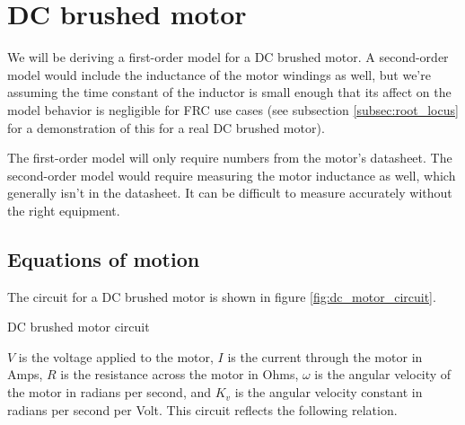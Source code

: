\section{DC brushed motor}
\label{sec:dc_brushed_motor}

We will be deriving a first-order \gls{model} for a DC brushed motor. A
second-order \gls{model} would include the inductance of the motor windings as
well, but we're assuming the time constant of the inductor is small enough that
its affect on the \gls{model} behavior is negligible for FRC use cases (see
subsection \ref{subsec:root_locus} for a demonstration of this for a real DC
brushed motor).

The first-order \gls{model} will only require numbers from the motor's
datasheet. The second-order \gls{model} would require measuring the motor
inductance as well, which generally isn't in the datasheet. It can be difficult
to measure accurately without the right equipment.

\subsection{Equations of motion}

The circuit for a DC brushed motor is shown in figure
\ref{fig:dc_motor_circuit}.

\begin{bookfigure}

  \caption{DC brushed motor circuit}
  \label{fig:dc_motor_circuit}
\end{bookfigure}

$V$ is the voltage applied to the motor, $I$ is the current through the motor in
Amps, $R$ is the resistance across the motor in Ohms, $\omega$ is the angular
velocity of the motor in radians per second, and $K_v$ is the angular velocity
constant in radians per second per Volt. This circuit reflects the following
relation.

